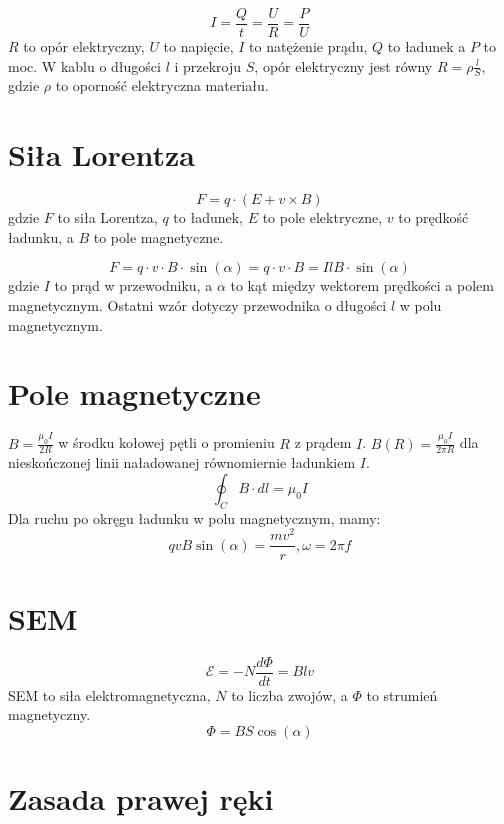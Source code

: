 \documentclass{../konspekt}
\begin{document}
\begin{multicols}{2}
  $$
  I = \frac{Q}{t} = \frac{U}{R} = \frac{P}{U}
  $$
  $R$ to opór elektryczny, $U$ to napięcie, $I$ to natężenie prądu,
  $Q$ to ładunek a $P$ to moc. W kablu o długości $l$ i przekroju $S$,
  opór elektryczny jest równy $R = \rho \frac{l}{S}$, gdzie $\rho$ to
  oporność elektryczna materiału.

  \section{Siła Lorentza}

  $$
  F = q \cdot (E + v \times B)
  $$
  gdzie $F$ to siła Lorentza, $q$ to ładunek, $E$ to pole elektryczne,
  $v$ to prędkość ładunku, a $B$ to pole magnetyczne.

  $$
  F = q \cdot v \cdot B \cdot \sin(\alpha) = q \cdot v \cdot B =
  IlB \cdot \sin(\alpha)
  $$
  gdzie $I$ to prąd w przewodniku,
  a $\alpha$ to kąt między wektorem prędkości a polem magnetycznym.
  Ostatni wzór dotyczy przewodnika o długości $l$ w polu magnetycznym.

  \section{Pole magnetyczne}

  $B = \frac{\mu_0 I}{2 R}$ w środku kołowej pętli o promieniu $R$ z prądem $I$.
  $B(R) = \frac{\mu_0 I}{2\pi R}$ dla nieskończonej linii naładowanej
  równomiernie ładunkiem $I$.
  $$
  \oint_{C} B \cdot dl = \mu_0 I
  $$
  Dla ruchu po okręgu ładunku w polu magnetycznym, mamy:
  $$
  qvB \sin(\alpha) = \frac{mv^2}{r}, \omega = 2 \pi f
  $$

  \section{SEM}

  $$
  \mathcal{E} = -N \frac{d \Phi}{dt} = Blv
  $$
  SEM to siła elektromagnetyczna, $N$ to liczba zwojów, a $\Phi$
  to strumień magnetyczny.
  $$
  \Phi = BS \cos(\alpha)
  $$

  \section{Zasada prawej ręki}

  \begin{center}
\end{center}
\end{multicols}
\end{document}
